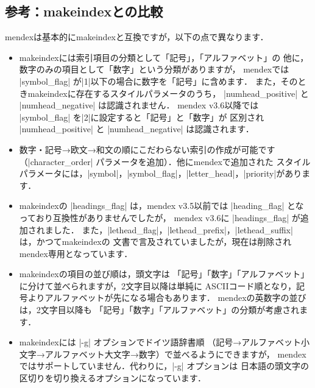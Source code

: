 \documentclass[a4paper,dvipdfmx]{jsarticle}
\newcommand{\SoftName}[1]{\textsf{#1}}
\begin{document}
\subsection{参考：\SoftName{makeindex}との比較}
\SoftName{mendex}は基本的に\SoftName{makeindex}と互換ですが，以下の点で異なります．

\begin{itemize}
\item \SoftName{makeindex}には索引項目の分類として「記号」，「アルファベット」の
  他に，数字のみの項目として「数字」という分類がありますが，
  \SoftName{mendex}では |symbol_flag| が|1|以下の場合に数字を「記号」に含めます．
  また，そのとき\SoftName{makeindex}に存在するスタイルパラメータのうち，
  |numhead_positive| と |numhead_negative| は認識されません．
  \SoftName{mendex} v3.6以降では |symbol_flag| を|2|に設定すると「記号」と「数字」が
  区別され |numhead_positive| と |numhead_negative| は認識されます．

\item 数字・記号→欧文→和文の順にこだわらない索引の作成が可能です
  （|character_order| パラメータを追加）．他に\SoftName{mendex}で追加された
  スタイルパラメータには，|symbol|，|symbol_flag|，|letter_head|，|priority|があります．

\item \SoftName{makeindex}の |headings_flag| は，\SoftName{mendex} v3.5以前では
  |heading_flag| となっており互換性がありませんでしたが，
  \SoftName{mendex} v3.6に |headings_flag| が追加されました．
  また，|lethead_flag|，|lethead_prefix|，|lethead_suffix| は，かつて\SoftName{makeindex}の
  文書で言及されていましたが，現在は削除され\SoftName{mendex}専用となっています．

\item \SoftName{makeindex}の項目の並び順は，頭文字は
  「記号」「数字」「アルファベット」に分けて並べられますが，2文字目以降は単純に
  ASCIIコード順となり，記号よりアルファベットが先になる場合もあります．
  \SoftName{mendex}の英数字の並びは，2文字目以降も
  「記号」「数字」「アルファベット」の分類が考慮されます．

\item \SoftName{makeindex}には |-g| オプションでドイツ語辞書順
  （記号→アルファベット小文字→アルファベット大文字→数字）で並べるようにできますが，
  \SoftName{mendex}ではサポートしていません．代わりに，|-g| オプションは
  日本語の頭文字の区切りを切り換えるオプションになっています．
\end{itemize}

%
%
\end{document}
